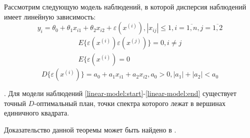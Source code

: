 	
Рассмотрим следующую модель наблюдений, в которой дисперсия наблюдений имеет линейную зависимость:
\begin{equation} \label{linear-model:start}
y_i = \theta_0 + \theta_1 x_{i1} + \theta_2 x_{i2} + \varepsilon(x^{(i)}), |x_{i j}| \le 1, i = \overline{1, n}, j = \overline{1, 2}
\end{equation}
\begin{equation}
\begin{split}
E\{\varepsilon(x^{(i)}) \varepsilon(x^{(j)}) \} = 0, i \ne j \\
E\{\varepsilon(x^{(i)}) = 0
\end{split}
\end{equation}
\begin{equation}\label{linear-model:end}
D\{ \varepsilon( x^{(i)} ) \} = a_0 + a_1 x_{i1} + a_2 x_{i2},
a_0 > 0, |a_1| + |a_2| < a_0
\end{equation}

\begin{theorem}.
	Для модели наблюдений \eqref{linear-model:start}-\eqref{linear-model:end} существует точный $D$-оптимальный план, точки спектра которого лежат в вершинах единичного квадрата.
\end{theorem}

Доказательство данной теоремы может быть найдено в \cite{kirlitsa2017}.

